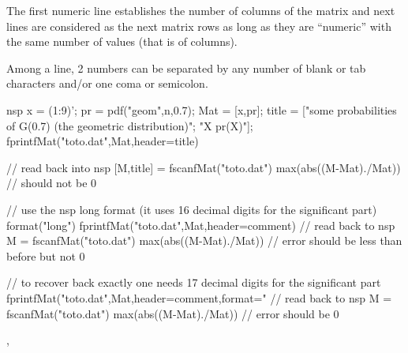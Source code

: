 The first numeric line establishes the number of columns of the matrix and next lines
are considered as the next matrix rows as long as they are ``numeric'' with the same
number of values (that is of columns).

Among a line, 2 numbers can be separated by
any number of blank or tab characters and/or one coma or semicolon.


\begin{examples}
  \begin{mintednsp}{nsp}
x = (1:9)'; pr = pdf("geom",n,0.7);
Mat = [x,pr];
title = ["some probabilities of G(0.7) (the geometric distribution)";
         "X pr(X)"];
fprintfMat("toto.dat",Mat,header=title)

// read  back into nsp
[M,title] = fscanfMat("toto.dat")
max(abs((M-Mat)./Mat))  // should not be 0

// use the nsp long format (it uses 16 decimal digits for the significant part)
format("long")
fprintfMat("toto.dat",Mat,header=comment)
// read  back to nsp
M = fscanfMat("toto.dat")
max(abs((M-Mat)./Mat))  // error should be less than before but not 0

// to recover back exactly one needs 17 decimal digits for the significant part
fprintfMat("toto.dat",Mat,header=comment,format="%
// read  back to nsp
M = fscanfMat("toto.dat")
max(abs((M-Mat)./Mat))  // error should be 0
\end{mintednsp}
\end{examples}

\begin{manseealso}
  , 
\end{manseealso}

